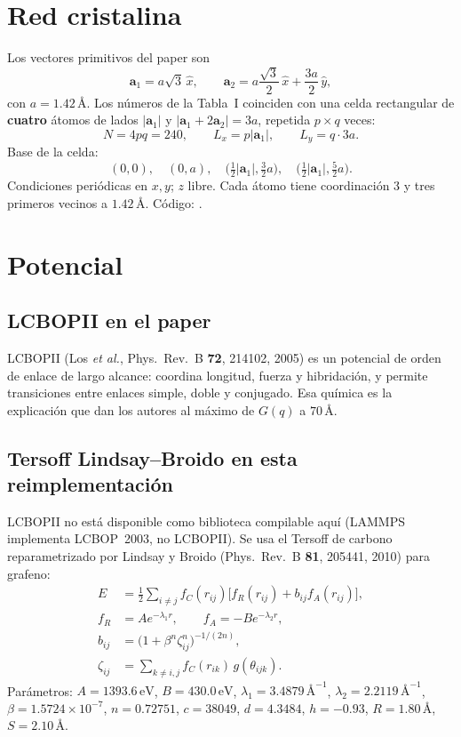 \documentclass[11pt,a4paper]{article}
\newcommand{\ruta}[1]{\path{#1}}
\begin{document}
\section{Red cristalina}

Los vectores primitivos del paper son
\[
\mathbf{a}_1=a\sqrt{3}\,\hat x,\qquad
\mathbf{a}_2=a\frac{\sqrt{3}}{2}\,\hat x+\frac{3a}{2}\,\hat y,
\]
con $a=1.42\,\text{\AA}$. Los números de la Tabla~I coinciden con una celda rectangular de \textbf{cuatro} átomos de lados $|\mathbf{a}_1|$ y $|\mathbf{a}_1+2\mathbf{a}_2|=3a$, repetida $p\times q$ veces:
\[
N=4pq=240,\qquad L_x=p|\mathbf{a}_1|,\qquad L_y=q\cdot 3a.
\]
Base de la celda:
\[
(0,0),\quad (0,a),\quad \bigl(\tfrac12|\mathbf{a}_1|,\tfrac32 a\bigr),\quad \bigl(\tfrac12|\mathbf{a}_1|,\tfrac52 a\bigr).
\]
Condiciones periódicas en $x,y$; $z$ libre. Cada átomo tiene coordinación 3 y tres primeros vecinos a $1.42\,\text{\AA}$. Código: \ruta{src/ripples/lattice.py}.

\section{Potencial}

\subsection{LCBOPII en el paper}

LCBOPII (Los \textit{et al.}, Phys.\ Rev.\ B \textbf{72}, 214102, 2005) es un potencial de orden de enlace de largo alcance: coordina longitud, fuerza y hibridación, y permite transiciones entre enlaces simple, doble y conjugado. Esa química es la explicación que dan los autores al máximo de $G(q)$ a $70\,\text{\AA}$.

\subsection{Tersoff Lindsay--Broido en esta reimplementación}

LCBOPII no está disponible como biblioteca compilable aquí (LAMMPS implementa LCBOP~2003, no LCBOPII). Se usa el Tersoff de carbono reparametrizado por Lindsay y Broido (Phys.\ Rev.\ B \textbf{81}, 205441, 2010) para grafeno:
\begin{align*}
E&=\frac12\sum_{i\neq j} f_C(r_{ij})\bigl[f_R(r_{ij})+b_{ij}f_A(r_{ij})\bigr],\\
f_R&=A e^{-\lambda_1 r},\qquad f_A=-B e^{-\lambda_2 r},\\
b_{ij}&=\bigl(1+\beta^n\zeta_{ij}^n\bigr)^{-1/(2n)},\\
\zeta_{ij}&=\sum_{k\neq i,j}f_C(r_{ik})\,g(\theta_{ijk}).
\end{align*}
Parámetros: $A=1393.6\,\mathrm{eV}$, $B=430.0\,\mathrm{eV}$, $\lambda_1=3.4879\,\text{\AA}^{-1}$, $\lambda_2=2.2119\,\text{\AA}^{-1}$, $\beta=1.5724\times 10^{-7}$, $n=0.72751$, $c=38049$, $d=4.3484$, $h=-0.93$, $R=1.80\,\text{\AA}$, $S=2.10\,\text{\AA}$.
\end{document}
